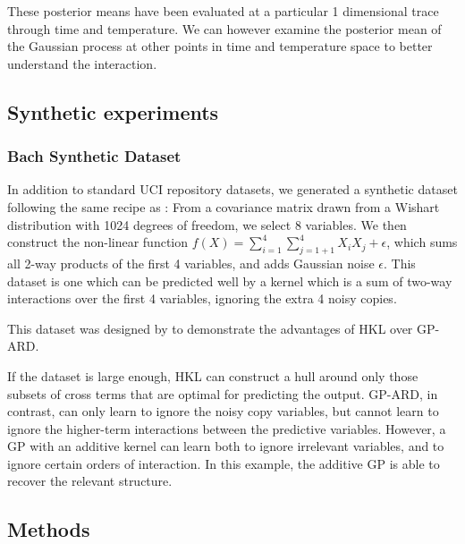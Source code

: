 \documentclass[twoside]{article}
\theoremstyle{definition}
\theoremstyle{remark}
\numberwithin{equation}{section}
\numberwithin{thm}{section}
\begin{document}
These posterior means have been evaluated at a particular 1 dimensional trace through time and temperature.
We can however examine the posterior mean of the Gaussian process at other points in time and temperature space to better understand the interaction.


\subsection{Synthetic experiments}

\subsubsection{Bach Synthetic Dataset}
In addition to standard UCI repository datasets, we generated a synthetic dataset following the same recipe as \cite{DBLP:journals/corr/abs-0909-0844}: From a covariance matrix drawn from a Wishart distribution with 1024 degrees of freedom, we select 8 variables.  We then construct the non-linear function $f(X) = \sum_{i=1}^4 \sum_{j=1+1}^4 X_i X_j + \epsilon$, which sums all 2-way products of the first 4 variables, and adds Gaussian noise $\epsilon$.  This dataset is one which can be predicted well by a kernel which is a sum of two-way interactions over the first 4 variables, ignoring the extra 4 noisy copies.

This dataset was designed by \cite{DBLP:journals/corr/abs-0909-0844} to demonstrate the advantages of HKL over GP-ARD. 

If the dataset is large enough, HKL can construct a hull around only those subsets of cross terms that are optimal for predicting the output.  GP-ARD, in contrast, can only learn to ignore the noisy copy variables, but cannot learn to ignore the higher-term interactions between the predictive variables.  However, a GP with an additive kernel can learn both to ignore irrelevant variables, and to ignore certain orders of interaction.  In this example, the additive GP is able to recover the relevant structure.

\subsection{Methods}
\end{document}
